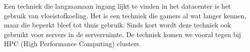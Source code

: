 Een techniek die langzaamaan ingang lijkt te vinden in het datacenter is het gebruik van vloeistofkoeling. Het is een techniek die gamers al wat langer kennen, maar die beperkt bleef tot thuis gebruik. Sinds kort wordt deze techniek ook gebruikt voor servers in de serverruimte. De techniek komen we vooral tegen bij HPC (High Performance Computing) clusters.

